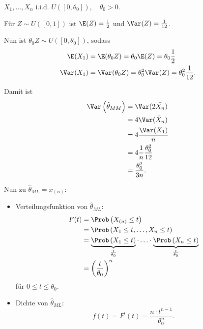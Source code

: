 \documentclass{tstextbook}
\begin{document}
\begin{example}
	$ X_1,\ldots,X_n $	i.i.d. $ U\left([0,\theta_0]\right), \quad \theta_0 > 0 $. 
	
	Für $ Z\sim U\left([0,1]\right) $ ist $ \E(Z)=\frac{1}{2} $ und $ \Var(Z)=\frac{1}{12} $. 
	
	Nun ist $ \theta_0 Z \sim U\left([0,\theta_0]\right) $, sodass 
	\[
	\begin{aligned}
	\E(X_1) &=\E(\theta_0 Z) = \theta_0 \E(Z) = \theta_0 \frac{1}{2} \\
	\Var(X_1) &= \Var(\theta_0 Z) = \theta_0^2 \Var(Z) = \theta_0^2 \frac{1}{12}.
	\end{aligned}
	\]
	
	Damit ist 
	\[
	\begin{aligned}
	\Var\left(\hat{\theta}_{MM}\right) & = \Var(2\bar{X_n}) \\
	& = 4 \Var(\bar{X}_n) \\
	& = 4 \frac{\Var(X_1)}{n}\\
	& = 4 \frac{1}{n} \frac{\theta_0^2}{12} \\
	& = \frac{\theta_0^2}{3n}. 
	\end{aligned}
	\]
	
	Nun zu $ \hat{\theta}_{ML} = x_{(n)} $: 
	\begin{itemize}
		\item Verteilungsfunktion von $ \hat{\theta}_{ML} $: 
		\[
		\begin{aligned}
			F(t) & = \Prob\left(X_{(n)} \le t \right) \\
			& = \Prob\left(X_1 \le t, \ldots, X_n \le t \right) \\
			& = \underbrace{\Prob\left(X_1 \le t \right)}_{\frac{t}{\theta_0}}\cdot\ldots\cdot \underbrace{\Prob\left(X_n \le t \right)}_{\frac{t}{\theta_0}} \\
			& = \left(\frac{t}{\theta_0}\right)^n 
		\end{aligned}
		\] für $ 0 \le t \le  \theta_0 $.
		
		\item Dichte von $ \hat{\theta}_{ML} $: 
		\[
		f(t) = F^\prime (t) = \frac{n\cdot t^{n-1}}{\theta_0^n}.
		\]
	\end{itemize}


\end{example}
\end{document}
